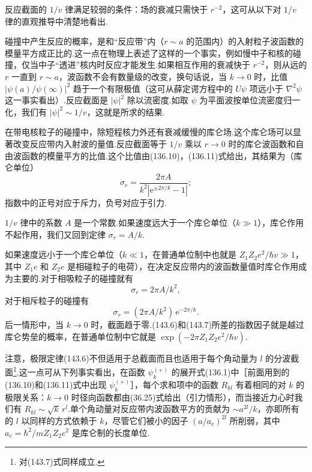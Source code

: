 反应截面的 $1/v$ 律满足较弱的条件：场的衰减只需快于 $r^{-2}$，这可从以下对 $1/v$ 律的直观推导中清楚地看出.

碰撞中产生反应的概率，是和“反应带”内（$r\sim a$ 的范围内）的入射粒子波函数的模量平方成正比的.这一点在物理上表述了这样的一个事实，例如慢中子和核的碰撞，仅当中子“透进”核内时反应才能发生.如果相互作用的衰减快于 $r^{-2}$，则从远的 $r$ 一直到 $r\sim a$，波函数不会有数量级的改变，换句话说，当 $k\to0$ 时，比值 $|\psi(a)/\psi(\infty)|^2$ 趋于一个有限极值（这可从薛定谔方程中的 $U\psi$ 项远小于 $\nabla^2\psi$ 这一事实看出）.反应截面是 $|\psi|^2$ 除以流密度.如取 $\psi$ 为平面波按单位流密度归一化，我们有 $|\psi|^2\sim1/v$，这就是所求的结果.

在带电核粒子的碰撞中，除短程核力外还有衰减缓慢的库仑场.这个库仑场可以显著改变反应带内入射波的量值.反应截面等于 $1/v$ 乘以 $r\to0$ 时的库仑波函数和自由波函数的模量平方的比值.这个比值由(136.10)，(136.11)式给出，其结果为（库仑单位）
\begin{equation}
  \sigma_r=\frac{2\pi A}{k^2|\mathrm{e}^{\pm2\pi/k}-1|};
\end{equation}
指数中的正号对应于斥力，负号对应于引力.

$1/v$ 律中的系数 $A$ 是一个常数.如果速度远大于一个库仑单位（$k\gg1$），库仑作用不起作用，我们又回到定律 $\sigma_r=A/k$.

如果速度远小于一个库仑单位（$k\ll1$，在普通单位制中也就是 $Z_1Z_2e^2/\hbar v\gg1$，其中 $Z_1e$ 和 $Z_2e$ 是相碰粒子的电荷），在决定反应带内的波函数量值时库仑作用成为主要的.对于相吸粒子的碰撞就有
\begin{equation}
  \sigma_r=2\pi A/k^2,
\end{equation}
对于相斥粒子的碰撞有
\begin{equation}
  \sigma_r=(2\pi A/k^2)\,\mathrm{e}^{-2\pi/k}.
\end{equation}
后一情形中，当 $k\to0$ 时，截面趋于零.(143.6)和(143.7)所差的指数因子就是越过库仑势垒的概率，在普通单位制中它就是 $\exp(-2\pi Z_1Z_2e^2/\hbar v)$.

注意，极限定律(143.6)不但适用于总截面而且也适用于每个角动量为 $l$ 的分波截面\footnote{对(143.7)式同样成立.}.这一点可从下列事实看出，在函数 $\psi_k^{(+)}$ 的展开式(136.1)中［前面用到的(136.10)和(136.11)式中出现 $\psi_k^{(+)}$］，每个求和项中的函数 $R_{kl}$ 有着相同的对 $k$ 的极限关系：$k\to0$ 时径向函数都由(36.25)式给出（引力情形），而当接近力心时我们有 $R_{kl}\sim\sqrt{k}\,r^l$.单个角动量对反应带内波函数平方的贡献为 $\sim a^{2l}/k$，亦即所有的 $l$ 以同样的方式依赖于 $k$，尽管它们被小的因子 $(a/a_{\mathrm{c}})^{2l}$ 所削弱，其中 $a_{\mathrm{c}}=\hbar^2/mZ_1Z_2e^2$ 是库仑制的长度单位.


